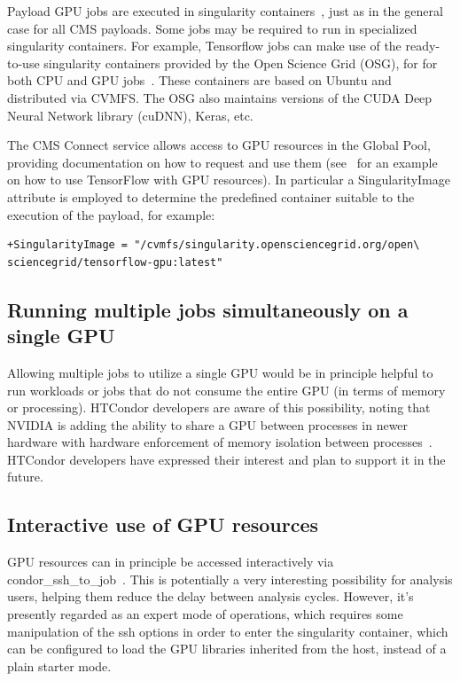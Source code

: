 \documentclass{webofc}
\begin{document}
Payload GPU jobs are executed in singularity containers~\cite{sing_gpu}, just as in the general case for all CMS payloads. Some jobs may be required to run in specialized singularity containers. For example, Tensorflow jobs can make use of the ready-to-use singularity containers provided by the Open Science Grid (OSG), for for both CPU and GPU jobs~\cite{tensorflow}. These containers are based on Ubuntu and distributed via CVMFS. The OSG also maintains versions of the CUDA Deep Neural Network library (cuDNN), Keras, etc. 

The CMS Connect service allows access to GPU resources in the Global Pool, providing documentation on how to request and use them (see~\cite{tensorflow_usage} for an example on how to use TensorFlow with GPU resources). In particular a SingularityImage attribute is employed to determine the predefined container suitable to the execution of the payload, for example:
\begin{verbatim}
+SingularityImage = "/cvmfs/singularity.opensciencegrid.org/open\
sciencegrid/tensorflow-gpu:latest"
\end{verbatim}

\subsection{Running multiple jobs simultaneously on a single GPU}
Allowing multiple jobs to utilize a single GPU would be in principle helpful to run workloads or jobs that do not consume the entire GPU (in terms of memory or processing). HTCondor developers are aware of this possibility, noting that NVIDIA is adding the ability to share a GPU between processes in newer hardware with hardware enforcement of memory isolation between processes~\cite{nvidia}. HTCondor developers have expressed their interest and plan to support it in the future. 
 
\subsection{Interactive use of GPU resources}
GPU resources can in principle be accessed interactively via condor\_ssh\_to\_job~\cite{ssh_to_job}. This is potentially a very interesting possibility for analysis users, helping them reduce the delay between analysis cycles. However, it's presently regarded as an expert mode of operations, which requires some manipulation of the ssh options in order to enter the singularity container, which can be configured to load the GPU libraries inherited from the host, instead of a plain starter mode.  
\end{document}

